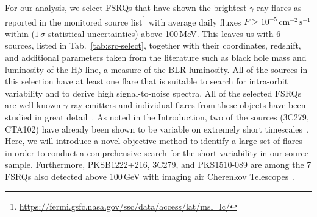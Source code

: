 \documentclass[twocolumn,linenumbers]{aastex62}
\newcommand{\gray}{$\gamma$-ray\xspace}
\begin{document}
For our analysis, we select FSRQs that have shown the brightest \gray flares as reported in the monitored source list\footnote{\url{https://fermi.gsfc.nasa.gov/ssc/data/access/lat/msl_lc/}}
with average daily fluxes $F \geqslant 10^{-5}\,\mathrm{cm}^{-2}\,\mathrm{s}^{-1}$ within ($1\,\sigma$ statistical uncertainties) above 100\,MeV.
This leaves us with 6 sources, listed in Tab.~\ref{tab:src-select}, together with their coordinates, redshift, and additional parameters taken from the literature such as black hole mass and luminosity of the $\mathrm{H}\beta$ line, a measure of the BLR luminosity.  
All of the sources in this selection have at least one 
flare that is suitable
to search for intra-orbit variability and to derive high signal-to-noise spectra. 
All of the selected FSRQs are well known \gray emitters and individual flares from these objects have been studied in great detail~\citep[e.g.,][]{2010ApJ...714L..73A,2011ApJ...733...19T,2015ApJ...808L..48P,TheFermi-LAT:2016dss,2013ApJ...766L..11S,2015ApJ...809..164D,2018ApJ...854L..26S,2011ApJ...733L..26A}. 
As noted in the Introduction, two of the sources (3C279, CTA102) have already been shown to be variable on extremely short timescales~\citep{TheFermi-LAT:2016dss,2018ApJ...854L..26S}. 
Here, we will introduce a novel objective method to identify a large set of flares in order to conduct a comprehensive search for the short variability in our source sample.  
Furthermore, PKSB1222+216, 3C279, and PKS1510-089  are among the 7 FSRQs also detected above 100\,GeV with imaging air Cherenkov Telescopes~\citep{2011ApJ...730L...8A,2013A&A...554A.107H,2014A&A...569A..46A,2008Sci...320.1752M}. 
\end{document}
